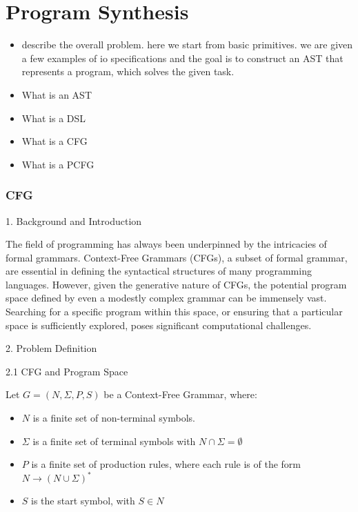% 


\section{Program Synthesis}

\begin{itemize}
    \item describe the overall problem. here we start from basic primitives. we are given a few examples of io specifications and the goal is to construct an AST that represents a program, which solves the given task.
    \item What is an AST
    \item What is a DSL 
    \item What is a CFG
    \item What is a PCFG
\end{itemize}

\subsubsection{CFG}

1. Background and Introduction

The field of programming has always been underpinned by the intricacies of formal grammars. Context-Free Grammars (CFGs), a subset of formal grammar, are essential in defining the syntactical structures of many programming languages. However, given the generative nature of CFGs, the potential program space defined by even a modestly complex grammar can be immensely vast. Searching for a specific program within this space, or ensuring that a particular space is sufficiently explored, poses significant computational challenges.

2. Problem Definition

2.1 CFG and Program Space

Let \( G = (N, \Sigma, P, S) \) be a Context-Free Grammar, where:
\begin{itemize}
    \item \( N \) is a finite set of non-terminal symbols.
    \item \( \Sigma \) is a finite set of terminal symbols with \newline \( N \cap \Sigma = \emptyset \)
    \item \( P \) is a finite set of production rules, where each rule is of the form \( N \rightarrow (N \cup \Sigma)^* \)
    \item \( S \) is the start symbol, with \( S \in N \)
\end{itemize}

